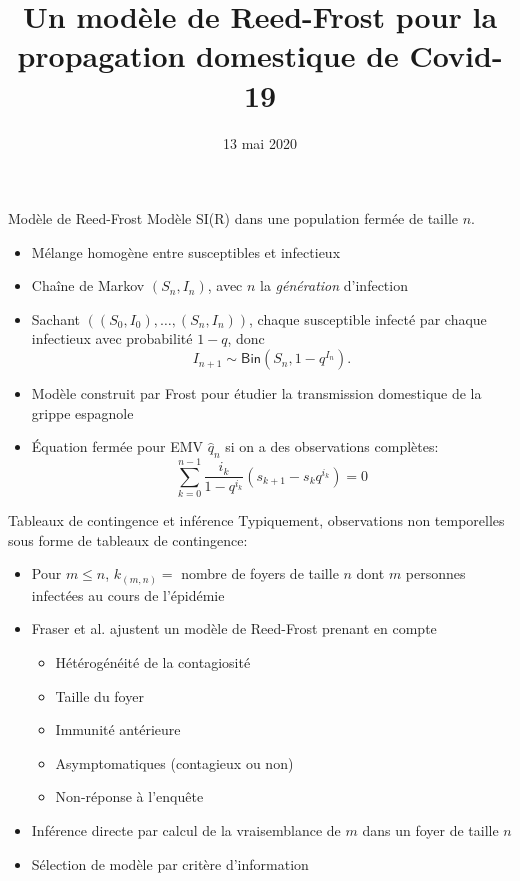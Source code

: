 \documentclass[dvipsnames,professionalfont,french]{beamer}
\title[Reed-Frost]{Un modèle de Reed-Frost pour la propagation domestique de
Covid-19}
\author[Patrick Hoscheit]{}
\date[13 mai 2020] %
{13 mai 2020}
\begin{document}
\begin{frame}
\titlepage 
\end{frame}

\begin{frame}{Modèle de Reed-Frost}
Modèle SI(R) dans une population fermée de taille \(n\).
\begin{itemize}
\item Mélange homogène entre susceptibles et infectieux
\item Chaîne de Markov \((S_n,I_n)\), avec \(n\) la \emph{génération} d'infection
\item Sachant \(((S_0,I_0),\dots,(S_n,I_n))\), chaque susceptible infecté par
chaque infectieux avec probabilité \(1-q\), donc 
\[ I_{n+1}  \sim \mathsf{Bin}(S_n,1-q^{I_n}).\]
\item Modèle construit par Frost pour étudier la transmission domestique de la
grippe espagnole
\item Équation fermée pour EMV \(\hat{q}_n\) si on a des observations complètes:
\[ 
	\sum_{k=0}^{n-1} \frac{i_k}{1-q^{i_k}}(s_{k+1}-s_kq^{i_k})=0
\]

\end{itemize}
\end{frame}

\begin{frame}{Tableaux de contingence et inférence}
Typiquement, observations non temporelles sous forme de tableaux de contingence:
\begin{itemize}
\item Pour \(m\le n\), \(k_{(m,n)}=\) nombre de foyers de taille \(n\) dont 
\(m\) personnes infectées au cours de l'épidémie
\item Fraser et al. ajustent un modèle de Reed-Frost prenant en compte
\begin{itemize}
\item Hétérogénéité de la contagiosité
\item Taille du foyer
\item Immunité antérieure
\item Asymptomatiques (contagieux ou non)
\item Non-réponse à l'enquête
\end{itemize}
\item Inférence directe par calcul de la vraisemblance de \(m\) dans un foyer
de taille \(n\)
\item Sélection de modèle par critère d'information
\end{itemize}
\end{frame}
\end{document}
